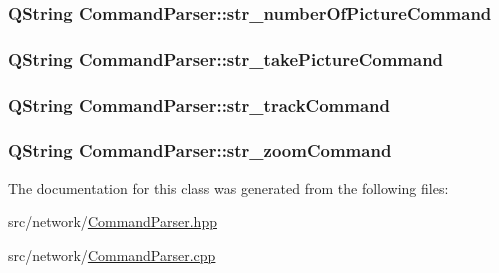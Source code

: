 \subsubsection[{\texorpdfstring{str\+\_\+number\+Of\+Picture\+Command}{str_numberOfPictureCommand}}]{\setlength{\rightskip}{0pt plus 5cm}Q\+String Command\+Parser\+::str\+\_\+number\+Of\+Picture\+Command\hspace{0.3cm}{\ttfamily [private]}}\hypertarget{class_command_parser_a559046950697f97b6ae5eaf796047bc7}{}\label{class_command_parser_a559046950697f97b6ae5eaf796047bc7}
\subsubsection[{\texorpdfstring{str\+\_\+take\+Picture\+Command}{str_takePictureCommand}}]{\setlength{\rightskip}{0pt plus 5cm}Q\+String Command\+Parser\+::str\+\_\+take\+Picture\+Command\hspace{0.3cm}{\ttfamily [private]}}\hypertarget{class_command_parser_aabaf039dbe579335f9db3fcdf99acd47}{}\label{class_command_parser_aabaf039dbe579335f9db3fcdf99acd47}
\subsubsection[{\texorpdfstring{str\+\_\+track\+Command}{str_trackCommand}}]{\setlength{\rightskip}{0pt plus 5cm}Q\+String Command\+Parser\+::str\+\_\+track\+Command\hspace{0.3cm}{\ttfamily [private]}}\hypertarget{class_command_parser_ac79c4a85b79d3e90d98b81ade014289a}{}\label{class_command_parser_ac79c4a85b79d3e90d98b81ade014289a}
\subsubsection[{\texorpdfstring{str\+\_\+zoom\+Command}{str_zoomCommand}}]{\setlength{\rightskip}{0pt plus 5cm}Q\+String Command\+Parser\+::str\+\_\+zoom\+Command\hspace{0.3cm}{\ttfamily [private]}}\hypertarget{class_command_parser_a12de7a4ebcfccaa8061e7e371a24ee63}{}\label{class_command_parser_a12de7a4ebcfccaa8061e7e371a24ee63}


The documentation for this class was generated from the following files\+:\begin{DoxyCompactItemize}
\item 
src/network/\hyperlink{_command_parser_8hpp}{Command\+Parser.\+hpp}\item 
src/network/\hyperlink{_command_parser_8cpp}{Command\+Parser.\+cpp}\end{DoxyCompactItemize}
